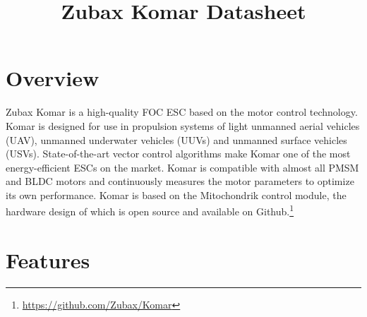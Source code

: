 \documentclass{zubaxdoc}
\title{Zubax Komar Datasheet}
\begin{document}
\frontmatter
\begin{titlepage}

\section*{Overview}

Zubax Komar is a high-quality FOC ESC based on the  motor control technology. Komar is designed for
use in propulsion systems of light unmanned aerial vehicles (UAV), unmanned underwater vehicles (UUVs) and
unmanned surface vehicles (USVs). State-of-the-art vector control algorithms make Komar one of the most
energy-efficient ESCs on the market. Komar is compatible with almost all PMSM and BLDC motors and continuously
measures the motor parameters to optimize its own performance. Komar is based on the Mitochondrik control module,
the hardware design of which is open source and available on Github.\footnote{\url{https://github.com/Zubax/Komar}}

\section*{Features}


\end{titlepage}
\end{document}
